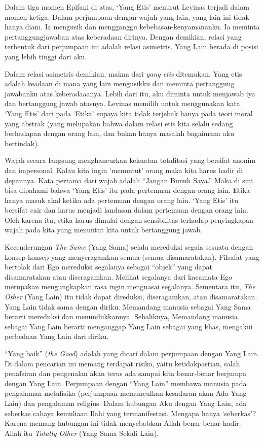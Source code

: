 \documentclass[11pt,twoside,a5paper,openany]{memoir}
\begin{document}
Dalam tiga momen Epifani di atas, `Yang Etis' menurut Levinas terjadi
dalam momen ketiga. Dalam perjumpaan dengan wajah yang lain, yang lain
ini tidak hanya diam. Ia mengusik dan mengganggu kebebasan-kenyamananku.
Ia meminta pertanggungjawaban atas keberadaan dirinya. Dengan demikian,
relasi yang terbentuk dari perjumpaan ini adalah relasi asimetris. Yang
Lain berada di posisi yang lebih tinggi dari aku.

Dalam relasi asimetris demikian, makna dari \emph{yang etis} ditemukan.
Yang etis adalah keadaan di mana yang lain mengusikku dan meminta
pertanggung jawabanku atas keberadaaanya. Lebih dari itu, aku diminta
untuk menjawab iya dan bertanggung jawab atasnya. Levinas memilih untuk
menggunakan kata `Yang Etis' dari pada `Etika' supaya kita tidak
terjebak hanya pada teori moral yang abstrak (yang melupakan bahwa dalam
relasi etis kita selalu sedang berhadapan dengan orang lain, dan bukan
hanya masalah bagaimana aku bertindak).

Wajah secara langsung menghancurkan kekuatan totalitasi yang bersifat
anonim dan impersonal. Kalau kita ingin `menuntut' orang maka kita harus
hadir di depannya. Kata pertama dari wajah adalah ``Jangan Bunuh Saya.''
Maka di sini bisa dipahami bahwa `Yang Etis' itu pada pertemuan dengan
orang lain. Etika hanya masuk akal ketika ada pertemuan dengan orang
lain. `Yang Etis' itu bersifat cair dan harus menjadi landasan dalam
pertemuan dengan orang lain. Oleh karena itu, etika harus dimulai dengan
sensibilitas terhadap penyingkapan wajah pada kita yang menuntut kita
untuk bertanggung jawab.

Kecenderungan \emph{The Same} (Yang Sama) selalu mereduksi segala
sesuatu dengan konsep-konsep yang menyeragamkan semua (semua
disamaratakan). Filsafat yang bertolak dari Ego mereduksi segalanya
sebagai ``objek'' yang dapat disamaratakan atau diseragamkan. Melihat
segalanya dari kacamata Ego merupakan mengungkapkan rasa ingin menguasai
segalanya. Sementara itu, \emph{The Other} (Yang Lain) itu tidak dapat
direduksi, diseragamkan, atau disamaratakan. Yang Lain tidak sama dengan
diriku. Memandang manusia sebagai Yang Sama berarti mereduksi dan
menundukkannya. Sebaliknya, Memandang manusia sebagai Yang Lain berarti
menganggap Yang Lain sebagai yang khas, mengakui perbedaan Yang Lain
dari diriku.

``Yang baik'' (\emph{the Good}) adalah yang dicari dalam perjumpaan
dengan Yang Lain. Di dalam pencarian ini memang terdapat risiko, yaitu
ketidakpastian, salah penafsiran dan pengenalan akan terus ada sampai
kita benar-benar berjumpa dengan Yang Lain. Perjumpaan dengan ``Yang
Lain'' membawa manusia pada pengalaman metafisika (perjumpaan
memunculkan kesadaran akan Ada Yang Lain) dan pengalaman religius. Dalam
hubungan Aku dengan Yang Lain, ada seberkas cahaya kemuliaan Ilahi yang
termanifestasi. Mengapa hanya `seberkas'? Karena memang hubungan ini
tidak menyebabkan Allah benar-benar hadir. Allah itu \emph{Totally
Other} (Yang Sama Sekali Lain).
\end{document}
